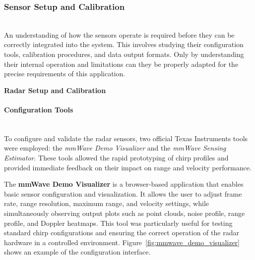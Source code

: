 \newpage
\subsubsection{Sensor Setup and Calibration}
\hfill
\\
An understanding of how the sensors operate is required before they can be correctly integrated into the system.  
This involves studying their configuration tools, calibration procedures, and data output formats.  
Only by understanding their internal operation and limitations can they be properly adapted for the precise requirements of this application.

\vspace{0.5em}
\noindent\textbf{Radar Setup and Calibration}
\label{sec:radar_setup_calibration}

\paragraph{Configuration Tools}
\hfill
\\
To configure and validate the radar sensors, two official Texas Instruments tools were employed: the \textit{mmWave Demo Visualizer} and the \textit{mmWave Sensing Estimator}.  
These tools allowed the rapid prototyping of chirp profiles and provided immediate feedback on their impact on range and velocity performance.  

The \textbf{mmWave Demo Visualizer} \cite{mmwave_demo_web, mmwave_demo_doc} is a browser-based application that enables basic sensor configuration and visualization.  
It allows the user to adjust frame rate, range resolution, maximum range, and velocity settings, while simultaneously observing output plots such as point clouds, noise profile, range profile, and Doppler heatmaps.  
This tool was particularly useful for testing standard chirp configurations and ensuring the correct operation of the radar hardware in a controlled environment.  
Figure~\ref{fig:mmwave_demo_visualizer} shows an example of the configuration interface.  

